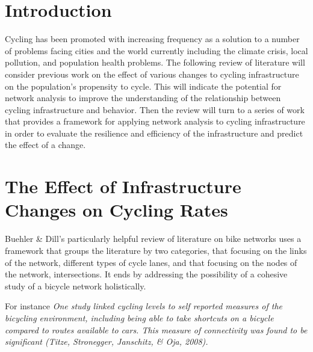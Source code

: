 \documentclass[11pt]{article} %
\begin{document}
\section{}

\section{}




\section{Introduction}

	Cycling has been promoted with increasing frequency as a solution to a number of problems facing cities and the world currently including the climate crisis, local pollution, and population health problems. The following review of literature will consider previous work on the effect of various changes to cycling infrastructure on the population's propensity to cycle. This will indicate the potential for network analysis to improve the understanding of the relationship between cycling infrastructure and behavior. Then the review will turn to a series of work that provides a framework for applying network analysis to cycling infrastructure in order to evaluate the resilience and efficiency of the infrastructure and predict the effect of a change. 
	
\section{The Effect of Infrastructure Changes on Cycling Rates}

	Buehler \& Dill's \cite{Buehler and Dill} particularly helpful review of literature on bike networks uses a framework that groups the literature by two categories, that focusing on the links of the network, different types of cycle lanes, and that focusing on the nodes of the network, intersections. It ends by addressing the possibility of a cohesive study of a bicycle network holistically. 
	
	For instance \textit{One study linked cycling levels to self reported measures of the bicycling environment, including being able to take shortcuts on a bicycle compared to routes available to cars. This measure of connectivity was found to be significant (Titze, Stronegger, Janschitz, \& Oja, 2008).}
	
\end{document}
